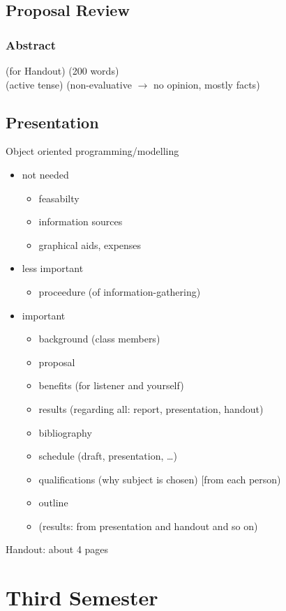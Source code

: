 \section{Proposal Review}

\subsection{Abstract}
(for Handout) (200 words)\\
(active tense) (non-evaluative $\to$ no opinion, mostly facts)

\section{Presentation}
Object oriented programming/modelling
\begin{itemize}
\item not needed
\begin{itemize}
\item feasabilty
\item information sources
\item graphical aids, expenses
\end{itemize}
\item less important
\begin{itemize}
\item proceedure (of information-gathering)
\end{itemize}
\item important
\begin{itemize}
\item background (class members)
\item proposal
\item benefits (for listener and yourself)
\item results (regarding all: report, presentation, handout)
\item bibliography
\item schedule (draft, presentation, …)
\item qualifications (why subject is chosen) [from each person)
\item outline
\item (results: from presentation and handout and so on)
\end{itemize}
\end{itemize}

Handout: about 4 pages

\chapter{Third Semester}

